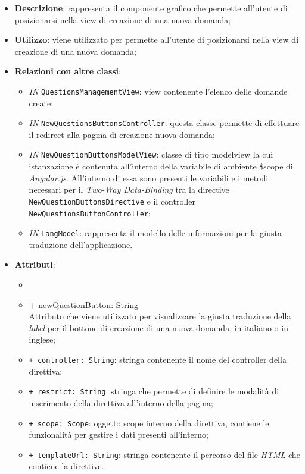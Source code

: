 \begin{itemize}
	\item \textbf{Descrizione}: rappresenta il componente grafico che permette all'utente di posizionarsi nella view di creazione di una nuova domanda;
	\item \textbf{Utilizzo}: viene utilizzato per permette all'utente di posizionarsi nella view di creazione di una nuova domanda;
	\item \textbf{Relazioni con altre classi}: 
	\begin{itemize}
		\item \textit{IN} \texttt{QuestionsManagementView}: view contenente l'elenco delle domande create; 
		\item \textit{IN} \texttt{NewQuestionsButtonsController}: questa classe permette di effettuare il redirect alla pagina di creazione nuova domanda;
		\item \textit{IN} \texttt{NewQuestionButtonsModelView}: classe di tipo modelview la cui istanzazione è contenuta all'interno della variabile di ambiente \$scope di \textit{Angular.js}. All'interno di essa sono presenti le variabili e i metodi necessari per il \textit{Two-Way Data-Binding} tra la directive \texttt{NewQuestionButtonsDirective} e il controller \texttt{NewQuestionsButtonController}; 
		\item \textit{IN} \texttt{LangModel}: rappresenta il modello delle informazioni per la giusta traduzione dell'applicazione.
	\end{itemize}
	\item \textbf{Attributi}: 
	\begin{itemize}
		\item \item {+ newQuestionButton: String} \\ Attributo che viene utilizzato per visualizzare la giusta traduzione della \textit{label} per il bottone di creazione di una nuova domanda, in italiano o in inglese;
		\item \texttt{+ controller: String}: stringa contenente il nome del controller della direttiva;
		\item \texttt{+ restrict: String}: stringa che permette di definire le modalità di inserimento della direttiva all'interno della pagina;
		\item \texttt{+ scope: Scope}: oggetto scope interno della direttiva, contiene le funzionalità per gestire i dati presenti all'interno;
		\item \texttt{+ templateUrl: String}: stringa contenente il percorso del file \textit{HTML} che contiene la direttive.
	\end{itemize}
\end{itemize}

